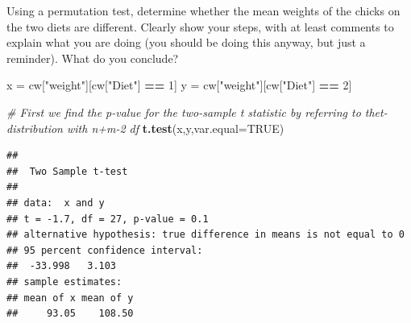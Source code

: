 \documentclass[
]{article}
\newenvironment{Shaded}{\begin{snugshade}}{\end{snugshade}}
\newcommand{\CommentTok}[1]{\textcolor[rgb]{0.56,0.35,0.01}{\textit{#1}}}
\newcommand{\DataTypeTok}[1]{\textcolor[rgb]{0.13,0.29,0.53}{#1}}
\newcommand{\DecValTok}[1]{\textcolor[rgb]{0.00,0.00,0.81}{#1}}
\newcommand{\KeywordTok}[1]{\textcolor[rgb]{0.13,0.29,0.53}{\textbf{#1}}}
\newcommand{\NormalTok}[1]{#1}
\newcommand{\OperatorTok}[1]{\textcolor[rgb]{0.81,0.36,0.00}{\textbf{#1}}}
\newcommand{\OtherTok}[1]{\textcolor[rgb]{0.56,0.35,0.01}{#1}}
\newcommand{\StringTok}[1]{\textcolor[rgb]{0.31,0.60,0.02}{#1}}
\begin{document}
Using a permutation test, determine whether the mean weights of the
chicks on the two diets are different. Clearly show your steps, with at
least comments to explain what you are doing (you should be doing this
anyway, but just a reminder). What do you conclude?

\begin{Shaded}
\begin{Highlighting}[]
\NormalTok{x =}\StringTok{ }\NormalTok{cw[}\StringTok{"weight"}\NormalTok{][cw[}\StringTok{"Diet"}\NormalTok{] }\OperatorTok{==}\StringTok{ }\DecValTok{1}\NormalTok{]}
\NormalTok{y =}\StringTok{ }\NormalTok{cw[}\StringTok{"weight"}\NormalTok{][cw[}\StringTok{"Diet"}\NormalTok{] }\OperatorTok{==}\StringTok{ }\DecValTok{2}\NormalTok{]}

\CommentTok{# First we find the p-value for the two-sample t statistic by referring to thet-distribution with n+m-2 df}
\KeywordTok{t.test}\NormalTok{(x,y,}\DataTypeTok{var.equal=}\OtherTok{TRUE}\NormalTok{)}
\end{Highlighting}
\end{Shaded}

\begin{verbatim}
## 
##  Two Sample t-test
## 
## data:  x and y
## t = -1.7, df = 27, p-value = 0.1
## alternative hypothesis: true difference in means is not equal to 0
## 95 percent confidence interval:
##  -33.998   3.103
## sample estimates:
## mean of x mean of y 
##     93.05    108.50
\end{verbatim}
\end{document}
